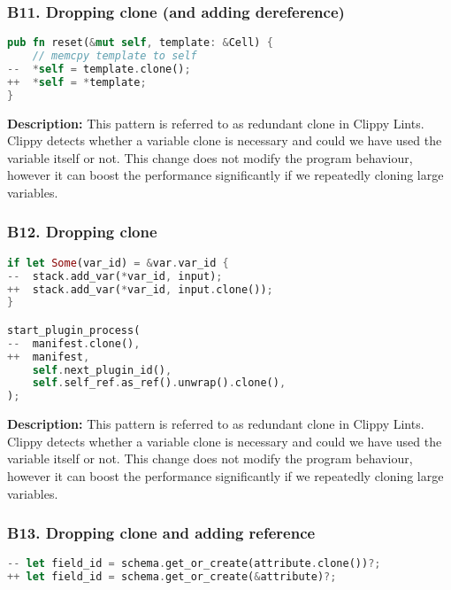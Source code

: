 \subsubsection{B11. Dropping clone (and adding dereference)}

\begin{lstlisting}[language=Rust, style=colouredRust, label={l3}]
pub fn reset(&mut self, template: &Cell) {
    // memcpy template to self
--  *self = template.clone();
++  *self = *template;
}
\end{lstlisting}

\noindent \textbf{Description:} This pattern is referred to as redundant clone in Clippy Lints. Clippy detects whether a variable clone is necessary and could we have used the variable itself or not. This change does not modify the program behaviour, however it can boost the performance significantly if we repeatedly cloning large variables. 

\subsubsection{B12. Dropping clone}

\begin{lstlisting}[language=Rust, style=colouredRust, label={l3}]
if let Some(var_id) = &var.var_id {
--  stack.add_var(*var_id, input);
++  stack.add_var(*var_id, input.clone());
}

start_plugin_process(
--  manifest.clone(),
++  manifest,
    self.next_plugin_id(),
    self.self_ref.as_ref().unwrap().clone(),
);

\end{lstlisting}

\noindent \textbf{Description:} This pattern is referred to as redundant clone in Clippy Lints. Clippy detects whether a variable clone is necessary and could we have used the variable itself or not. This change does not modify the program behaviour, however it can boost the performance significantly if we repeatedly cloning large variables. 

\subsubsection{B13. Dropping clone and adding reference}

\begin{lstlisting}[language=Rust, style=colouredRust, label={l3}]
-- let field_id = schema.get_or_create(attribute.clone())?;
++ let field_id = schema.get_or_create(&attribute)?;
\end{lstlisting}

